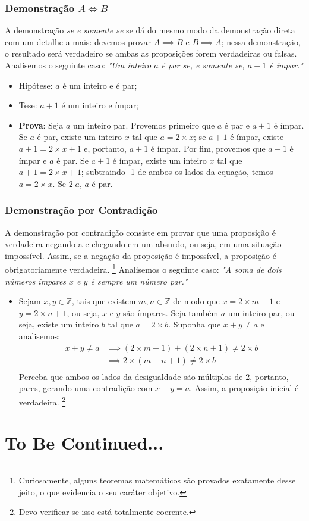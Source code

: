 \documentclass{article}
\begin{document}
\subsubsection{Demonstração $A \iff B$}
A demonstração \emph{se e somente se} se dá do mesmo modo da demonstração direta com um detalhe a mais: devemos provar $A \implies B$ e $B \implies A$; nessa demonstração, o resultado será verdadeiro se ambas as proposições forem verdadeiras ou falsas.
Analisemos o seguinte caso: \emph{"Um inteiro $a$ é par se, e somente se, $a + 1$ é ímpar."}
\begin{itemize}
    \item Hipótese: $a$ é um inteiro e é par;
    \item Tese: $a + 1$ é um inteiro e ímpar;
    \item \textbf{Prova}: Seja $a$ um inteiro par. Provemos primeiro que $a$ é par e $a + 1$ é ímpar. Se $a$ é par, existe um inteiro $x$ tal que $a = 2 \times x$; se $a + 1$ é ímpar, existe $a + 1 = 2 \times x + 1$ e, portanto, $a + 1$ é ímpar.
    Por fim, provemos que $a + 1$ é ímpar e $a$ é par.
    Se $a + 1$ é ímpar, existe um inteiro $x$ tal que $a + 1 = 2 \times x + 1$; subtraindo -1 de ambos os lados da equação, temos $a = 2 \times x$. Se $2|a$, $a$ é par.
    
\end{itemize}

\subsubsection{Demonstração por Contradição}
A demonstração por contradição consiste em provar que uma proposição é verdadeira negando-a e chegando em um absurdo, ou seja, em uma situação impossível. Assim, se a negação da proposição é impossível, a proposição é obrigatoriamente verdadeira. \footnote{Curiosamente, alguns teoremas matemáticos são provados exatamente desse jeito, o que evidencia o seu caráter objetivo.}
Analisemos o seguinte caso: \emph{"A soma de dois números ímpares $x$ e $y$ é sempre um número par."}
\begin{itemize}
    \item Sejam $x, y \in \mathbb{Z}$, tais que existem $m, n \in \mathbb{Z}$ de modo que $x = 2 \times m + 1$ e $y = 2 \times n + 1$, ou seja, $x$ e $y$ são ímpares. Seja também $a$ um inteiro par, ou seja, existe um inteiro $b$ tal que $a = 2 \times b$. Suponha que $x + y \ne a$ e analisemos:
    \begin{align*}
        x + y \ne a &\implies
        (2 \times m + 1) + (2 \times n + 1) \ne 2 \times b \\ &\implies
        2 \times (m + n + 1) \ne 2 \times b \\
    \end{align*}
    Perceba que ambos os lados da desigualdade são múltiplos de 2, portanto, pares, gerando uma contradição com $x + y = a$. Assim, a proposição inicial é verdadeira. \footnote{Devo verificar se isso está totalmente coerente.}
\end{itemize}

\section{To Be Continued...}
\end{document}
